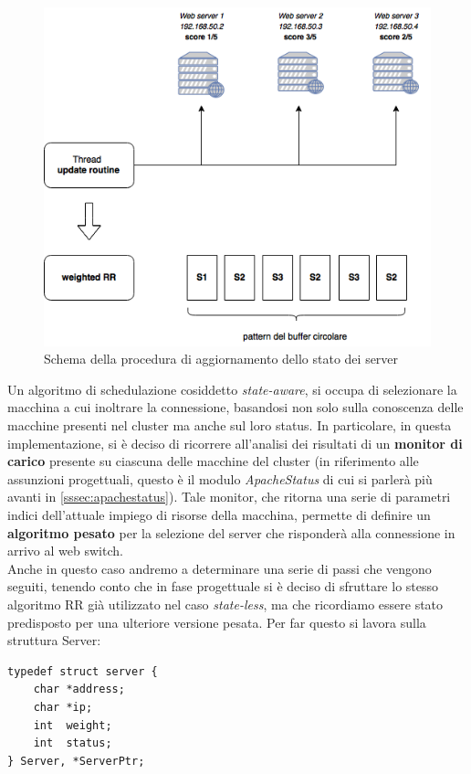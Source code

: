\documentclass[italian]{tktltiki2}
\begin{document}
\begin{figure}[t]
\centering
\includegraphics[width=\textwidth]{images/rrobin_stateaware}
\caption{Schema della procedura di aggiornamento dello stato dei server
\label{fig:rrobin_sa}}
\end{figure}
Un algoritmo di schedulazione cosiddetto \emph{state-aware}, si occupa di selezionare la macchina a cui inoltrare la connessione, basandosi non solo sulla conoscenza delle macchine presenti nel cluster ma anche sul loro status. In particolare, in questa implementazione, si è deciso di ricorrere all'analisi dei risultati di un \textbf{monitor di carico} presente su ciascuna delle macchine del cluster (in riferimento alle assunzioni progettuali, questo è il modulo \emph{ApacheStatus} di cui si parlerà più avanti in \ref{sssec:apachestatus}). Tale monitor, che ritorna una serie di parametri indici dell'attuale impiego di risorse della macchina, permette di definire un \textbf{algoritmo pesato} per la selezione del server che risponderà alla connessione in arrivo al web switch. \\
Anche in questo caso andremo a determinare una serie di passi che vengono seguiti, tenendo conto che in fase progettuale si è deciso di sfruttare lo stesso algoritmo RR già utilizzato nel caso \emph{state-less}, ma che ricordiamo essere stato predisposto per una ulteriore versione pesata. Per far questo si lavora sulla struttura Server:
\begin{lstlisting}
typedef struct server {
    char *address;
    char *ip;
    int  weight;
    int  status;
} Server, *ServerPtr;
\end{lstlisting}
\end{document}
